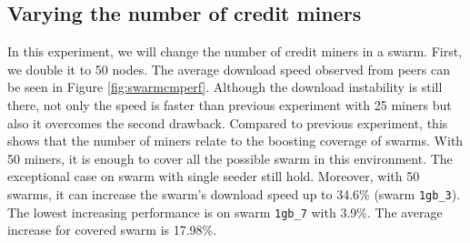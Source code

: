 \subsection{Varying the number of credit miners}
In this experiment, we will change the number of credit miners in a swarm. First, we double it to 50 nodes. The average download speed observed from peers can be seen in Figure \ref{fig:swarmcmperf}. Although the download instability is still there, not only the speed is faster than previous experiment with 25 miners but also it overcomes the second drawback. Compared to previous experiment, this shows that the number of miners relate to the boosting coverage of swarms. With 50 miners, it is enough to cover all the possible swarm in this environment. The exceptional case on swarm with single seeder still hold. Moreover, with 50 swarms, it can increase the swarm's download speed up to 34.6\% (swarm \texttt{1gb\_3}). The lowest increasing performance is on swarm \texttt{1gb\_7} with 3.9\%. The average increase for covered swarm is 17.98\%.

